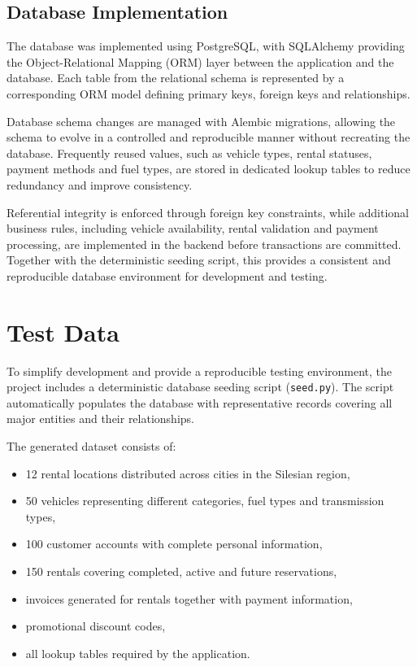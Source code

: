 \subsection{Database Implementation}

The database was implemented using PostgreSQL, with SQLAlchemy providing the Object-Relational Mapping (ORM) layer between the application and the database. Each table from the relational schema is represented by a corresponding ORM model defining primary keys, foreign keys and relationships.

Database schema changes are managed with Alembic migrations, allowing the schema to evolve in a controlled and reproducible manner without recreating the database. Frequently reused values, such as vehicle types, rental statuses, payment methods and fuel types, are stored in dedicated lookup tables to reduce redundancy and improve consistency.

Referential integrity is enforced through foreign key constraints, while additional business rules, including vehicle availability, rental validation and payment processing, are implemented in the backend before transactions are committed. Together with the deterministic seeding script, this provides a consistent and reproducible database environment for development and testing.
\newpage






\section{Test Data}

To simplify development and provide a reproducible testing environment, the project includes a deterministic database seeding script (\texttt{seed.py}). The script automatically populates the database with representative records covering all major entities and their relationships.

The generated dataset consists of:

\begin{itemize}
    \item 12 rental locations distributed across cities in the Silesian region,
    \item 50 vehicles representing different categories, fuel types and transmission types,
    \item 100 customer accounts with complete personal information,
    \item 150 rentals covering completed, active and future reservations,
    \item invoices generated for rentals together with payment information,
    \item promotional discount codes,
    \item all lookup tables required by the application.
\end{itemize}

